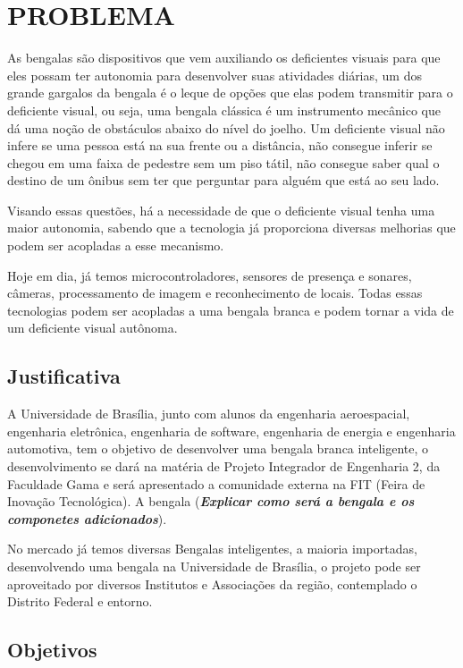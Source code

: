 \chapter[Problema]{PROBLEMA}

As bengalas são dispositivos que vem auxiliando os deficientes visuais para que eles possam ter autonomia para desenvolver suas atividades diárias, um dos grande gargalos da bengala é o leque de opções que elas podem transmitir para o deficiente visual, ou seja, uma bengala clássica é um instrumento mecânico que dá uma noção de obstáculos abaixo do nível do joelho. Um deficiente visual não infere se uma pessoa está na sua frente ou a distância, não consegue inferir se chegou em uma faixa de pedestre sem um piso tátil, não consegue saber qual o destino de um ônibus sem ter que perguntar para alguém que está ao seu lado.
	
	Visando essas questões, há a necessidade de que o deficiente visual tenha uma maior autonomia, sabendo que a tecnologia já proporciona diversas melhorias que podem ser acopladas a esse mecanismo.
	
	Hoje em dia, já temos microcontroladores, sensores de presença e sonares, câmeras, processamento de imagem e reconhecimento de locais. Todas essas tecnologias podem ser acopladas a uma bengala branca e podem tornar a vida de um deficiente visual autônoma. 

\section{Justificativa}

	A Universidade de Brasília, junto com alunos da engenharia aeroespacial, engenharia eletrônica, engenharia de software, engenharia de energia e engenharia automotiva, tem o objetivo de desenvolver uma bengala branca inteligente, o desenvolvimento se dará na matéria de Projeto Integrador de Engenharia 2, da Faculdade Gama e será apresentado a comunidade externa na FIT (Feira de Inovação Tecnológica). A bengala (\textbf{\textit{Explicar como será a bengala e os componetes adicionados}}).
	
	No mercado já temos diversas Bengalas inteligentes, a maioria importadas, desenvolvendo uma bengala na Universidade de Brasília, o projeto pode ser aproveitado por diversos Institutos e Associações da região, contemplado o Distrito Federal e entorno.
	

\section{Objetivos}

